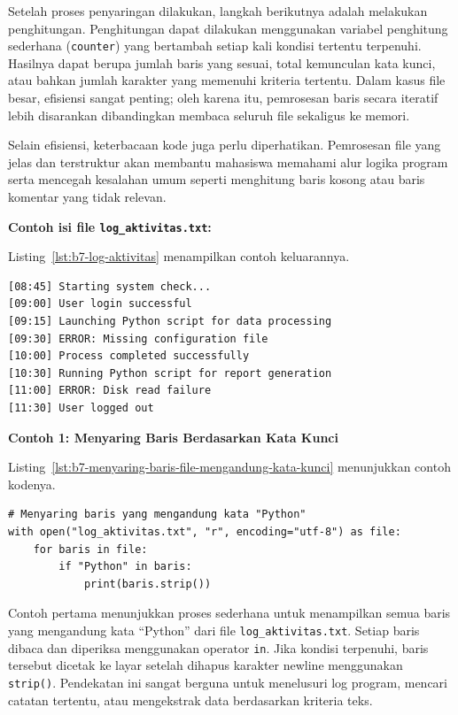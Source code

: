 Setelah proses penyaringan dilakukan, langkah berikutnya adalah melakukan penghitungan. Penghitungan dapat dilakukan menggunakan variabel penghitung sederhana (\texttt{counter}) yang bertambah setiap kali kondisi tertentu terpenuhi. Hasilnya dapat berupa jumlah baris yang sesuai, total kemunculan kata kunci, atau bahkan jumlah karakter yang memenuhi kriteria tertentu. Dalam kasus file besar, efisiensi sangat penting; oleh karena itu, pemrosesan baris secara iteratif lebih disarankan dibandingkan membaca seluruh file sekaligus ke memori.

Selain efisiensi, keterbacaan kode juga perlu diperhatikan. Pemrosesan file yang jelas dan terstruktur akan membantu mahasiswa memahami alur logika program serta mencegah kesalahan umum seperti menghitung baris kosong atau baris komentar yang tidak relevan.

\noindent\textbf{Contoh isi file \texttt{log\_aktivitas.txt}:}

Listing~\ref{lst:b7-log-aktivitas} menampilkan contoh keluarannya.

\begin{lstlisting}[language=bash, caption={Cuplikan isi file log_aktivitas.txt}, label={lst:b7-log-aktivitas}]
[08:45] Starting system check...
[09:00] User login successful
[09:15] Launching Python script for data processing
[09:30] ERROR: Missing configuration file
[10:00] Process completed successfully
[10:30] Running Python script for report generation
[11:00] ERROR: Disk read failure
[11:30] User logged out
\end{lstlisting}

\noindent\textbf{Contoh 1: Menyaring Baris Berdasarkan Kata Kunci}

Listing~\ref{lst:b7-menyaring-baris-file-mengandung-kata-kunci} menunjukkan contoh kodenya.

\begin{lstlisting}[style=PythonStyle, caption={Menyaring baris file yang mengandung kata kunci tertentu}, label={lst:b7-menyaring-baris-file-mengandung-kata-kunci}]
# Menyaring baris yang mengandung kata "Python"
with open("log_aktivitas.txt", "r", encoding="utf-8") as file:
    for baris in file:
        if "Python" in baris:
            print(baris.strip())
\end{lstlisting}

Contoh pertama menunjukkan proses sederhana untuk menampilkan semua baris yang mengandung kata “Python” dari file \texttt{log_aktivitas.txt}. Setiap baris dibaca dan diperiksa menggunakan operator \texttt{in}. Jika kondisi terpenuhi, baris tersebut dicetak ke layar setelah dihapus karakter newline menggunakan \texttt{strip()}. Pendekatan ini sangat berguna untuk menelusuri log program, mencari catatan tertentu, atau mengekstrak data berdasarkan kriteria teks.

